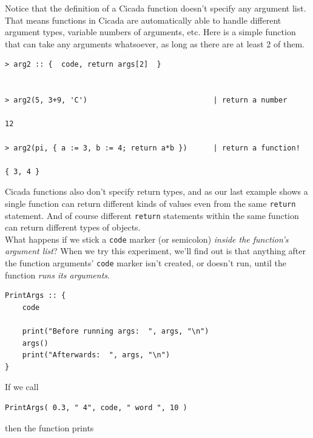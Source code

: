 \documentclass{article}
\newenvironment{code}{
       \begin{list}{}{
               \setlength{\leftmargin}{.4in}
               \setlength{\rightmargin}{0in}
               \setlength{\topsep}{.2in}
       }
       \small
       \item[] }
       { \end{list}   }
\begin{document}
Notice that the definition of a Cicada function doesn't specify any argument list.  That means functions in Cicada are automatically able to handle different argument types, variable numbers of arguments, etc.  Here is a simple function that can take any arguments whatsoever, as long as there are at least 2 of them.

\begin{code} \begin{verbatim}
> arg2 :: {  code, return args[2]  }


> arg2(5, 3+9, 'C')                             | return a number

12

> arg2(pi, { a := 3, b := 4; return a*b })      | return a function! 

{ 3, 4 }
\end{verbatim} \end{code}

\noindent Cicada functions also don't specify return types, and as our last example shows a single function can return different kinds of values even from the same \verb#return# statement.  And of course different \verb#return# statements within the same function can return different types of objects.\\

What happens if we stick a \texttt{code} marker (or semicolon) \emph{inside the function's argument list}?  When we try this experiment, we'll find out is that anything after the function arguments' \verb#code# marker isn't created, or doesn't run, until the function \emph{runs its arguments}.

\begin{code} \begin{verbatim}
PrintArgs :: {
    code
    
    print("Before running args:  ", args, "\n")
    args()
    print("Afterwards:  ", args, "\n")
}
\end{verbatim} \end{code}

\noindent If we call

\begin{code} \begin{verbatim}
PrintArgs( 0.3, " 4", code, " word ", 10 )
\end{verbatim} \end{code}

\noindent then the function prints
\end{document}
